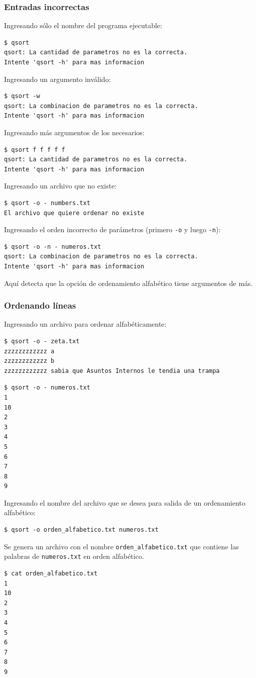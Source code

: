 \documentclass[a4paper, 12pt]{article}
\begin{document}
	\subsubsection{Entradas incorrectas}
	Ingresando sólo el nombre del programa ejecutable:
	\begin{verbatim}
$ qsort
qsort: La cantidad de parametros no es la correcta.
Intente 'qsort -h' para mas informacion
	\end{verbatim}
	
	Ingresando un argumento inválido:
	\begin{verbatim}
$ qsort -w
qsort: La combinacion de parametros no es la correcta.
Intente 'qsort -h' para mas informacion
	\end{verbatim}
	
	Ingresando más argumentos de los necesarios:
	\begin{verbatim}
$ qsort f f f f f
qsort: La cantidad de parametros no es la correcta.
Intente 'qsort -h' para mas informacion
	\end{verbatim}
	
	Ingresando un archivo que no existe:
	\begin{verbatim}
$ qsort -o - numbers.txt
El archivo que quiere ordenar no existe
	\end{verbatim}
	
	Ingresando el orden incorrecto de parámetros (primero \texttt{-o} y luego \texttt{-n}):
	\begin{verbatim}
$ qsort -o -n - numeros.txt
qsort: La combinacion de parametros no es la correcta.
Intente 'qsort -h' para mas informacion
	\end{verbatim}
	Aquí detecta que la opción de ordenamiento alfabético tiene argumentos de más.
	
	
	
	\subsubsection{Ordenando líneas}
	Ingresando un archivo para ordenar alfabéticamente:
	\begin{verbatim}
$ qsort -o - zeta.txt
zzzzzzzzzzzz a
zzzzzzzzzzzz b
zzzzzzzzzzzz sabia que Asuntos Internos le tendia una trampa
	\end{verbatim}
	
	\begin{verbatim}
$ qsort -o - numeros.txt
1
10
2
3
4
5
6
7
8
9
	\end{verbatim}
	
	Ingresando el nombre del archivo que se desea para salida de un ordenamiento alfabético:
	\begin{verbatim}
$ qsort -o orden_alfabetico.txt numeros.txt
	\end{verbatim}
	Se genera un archivo con el nombre \texttt{orden\_alfabetico.txt} que contiene las palabras de \texttt{numeros.txt} en orden alfabético.
	\begin{verbatim}
$ cat orden_alfabetico.txt
1
10
2
3
4
5
6
7
8
9
	\end{verbatim}
	
\end{document}
